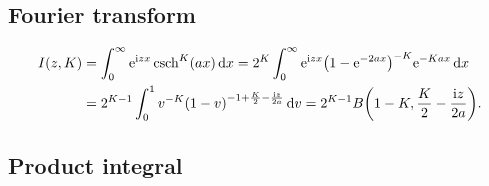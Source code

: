 \documentclass[english, parskip=full]{scrartcl}
\begin{document}
\subsection{Fourier transform}
\begin{align}
I(z,K) &= \intx{0}{\infty}{\powe{\i zx} \csch^K(ax)}{x} = 2^K \intx{0}{\infty}{\powe{\i zx} \kla*{1 - \powe{-2ax}}^{-K} \powe{-Kax}}{x}\\
&= 2^{K-1} \intx{0}{1}{v^{-K} \kla*{1 - v}^{-1 + \frac{K}{2} - \frac{\i z}{2a}}}{v} = 2^{K-1} B\kla*{1 - K, \frac{K}{2} - \frac{\i z}{2a}}.
\end{align}
\subsection{Product integral}
\end{document}
